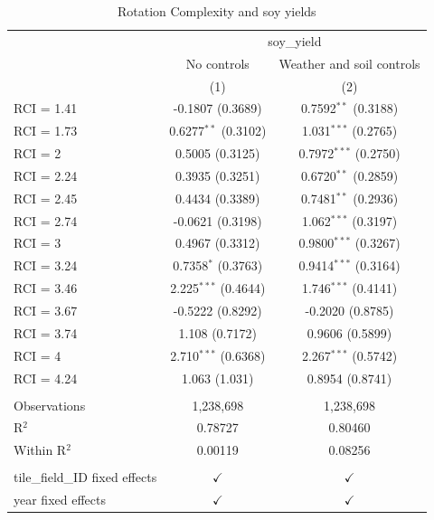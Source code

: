 
\begin{table}[H]
   \caption{\label{tab:soy_rci} Rotation Complexity and soy yields}
   \bigskip
   \centering
   \begin{tabular}{lcc}
      \toprule
       & \multicolumn{2}{c}{soy\_yield}\\
                                      & No controls            & Weather and soil controls \\   
                                      & (1)                    & (2)\\  
      \midrule 
      RCI = 1.41                      & -0.1807 (0.3689)       & 0.7592$^{**}$ (0.3188)\\   
      RCI = 1.73                      & 0.6277$^{**}$ (0.3102) & 1.031$^{***}$ (0.2765)\\   
      RCI = 2                         & 0.5005 (0.3125)        & 0.7972$^{***}$ (0.2750)\\   
      RCI = 2.24                      & 0.3935 (0.3251)        & 0.6720$^{**}$ (0.2859)\\   
      RCI = 2.45                      & 0.4434 (0.3389)        & 0.7481$^{**}$ (0.2936)\\   
      RCI = 2.74                      & -0.0621 (0.3198)       & 1.062$^{***}$ (0.3197)\\   
      RCI = 3                         & 0.4967 (0.3312)        & 0.9800$^{***}$ (0.3267)\\   
      RCI = 3.24                      & 0.7358$^{*}$ (0.3763)  & 0.9414$^{***}$ (0.3164)\\   
      RCI = 3.46                      & 2.225$^{***}$ (0.4644) & 1.746$^{***}$ (0.4141)\\   
      RCI = 3.67                      & -0.5222 (0.8292)       & -0.2020 (0.8785)\\   
      RCI = 3.74                      & 1.108 (0.7172)         & 0.9606 (0.5899)\\   
      RCI = 4                         & 2.710$^{***}$ (0.6368) & 2.267$^{***}$ (0.5742)\\   
      RCI = 4.24                      & 1.063 (1.031)          & 0.8954 (0.8741)\\   
       \\
      Observations                    & 1,238,698              & 1,238,698\\  
      R$^2$                           & 0.78727                & 0.80460\\  
      Within R$^2$                    & 0.00119                & 0.08256\\  
       \\
      tile\_field\_ID fixed effects   & $\checkmark$           & $\checkmark$\\   
      year fixed effects              & $\checkmark$           & $\checkmark$\\   
      \bottomrule
   \end{tabular}
\end{table}


